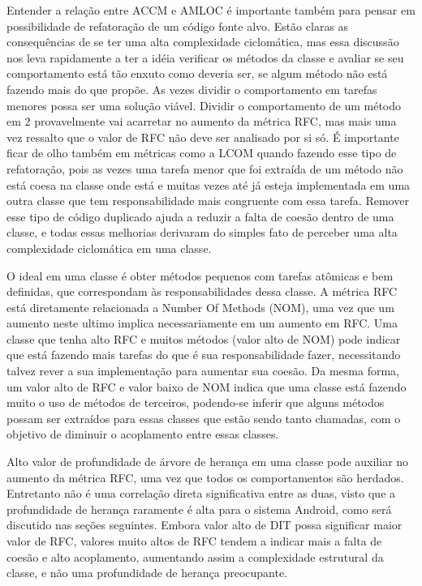 Entender a relação entre ACCM e AMLOC é importante também para pensar em possibilidade de refatoração de um código fonte alvo. Estão claras as consequências de se ter uma alta complexidade ciclomática, mas essa discussão nos leva rapidamente a ter a idéia verificar os métodos da classe e avaliar se seu comportamento está tão enxuto como deveria ser, se algum método não está fazendo mais do que propõe. As vezes dividir o comportamento em tarefas menores possa ser uma solução viável. Dividir o comportamento de um método em 2 provavelmente vai acarretar no aumento da métrica RFC, mas mais uma vez ressalto que o valor de RFC não deve ser analisado por si só. É importante ficar de olho também em métricas como a LCOM quando fazendo esse tipo de refatoração, pois as vezes uma tarefa menor que foi extraída de um método não está coesa na classe onde está e muitas vezes até já esteja implementada em uma outra classe que tem responsabilidade mais congruente com essa tarefa. Remover esse tipo de código duplicado ajuda a reduzir a falta de coesão dentro de uma classe, e todas essas melhorias derivaram do simples fato de perceber uma alta complexidade ciclomática em uma classe.

O ideal em uma classe é obter métodos pequenos com tarefas atômicas e bem definidas, que correspondam às responsabilidades dessa classe. A métrica RFC está diretamente relacionada a Number Of Methods (NOM), uma vez que um aumento neste ultimo implica necessariamente em um aumento em RFC. Uma classe que tenha alto RFC e muitos métodos (valor alto de NOM) pode indicar que está fazendo mais tarefas do que é sua responsabilidade fazer, necessitando talvez rever a sua implementação para aumentar sua coesão. Da mesma forma, um valor alto de RFC e valor baixo de NOM indica que uma classe está fazendo muito o uso de métodos de terceiros, podendo-se inferir que alguns métodos possam ser extraídos para essas classes que estão sendo tanto chamadas, com o objetivo de diminuir o acoplamento entre essas classes.

Alto valor de profundidade de árvore de herança em uma classe pode auxiliar no aumento da métrica RFC, uma vez que todos os comportamentos são herdados. Entretanto não é uma correlação direta significativa entre as duas, visto que a profundidade de herança raramente é alta para o sistema Android, como será discutido nas seções seguintes. Embora valor alto de DIT possa significar maior valor de RFC, valores muito altos de RFC tendem a indicar mais a falta de coesão e alto acoplamento, aumentando assim a complexidade estrutural da classe, e não uma profundidade de herança preocupante.

